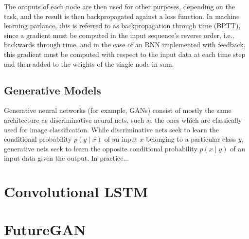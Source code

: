 \documentclass{scrartcl}
\begin{document}
The outputs of each node are then used for other purposes, depending on the
task, and the result is then backpropagated against a loss function. In machine
learning parlance, this is referred to as backpropagation through time (BPTT),
since a gradient must be computed in the input sequence's reverse order, i.e.,
backwards through time, and in the case of an RNN implemented with feedback,
this gradient must be computed with respect to the input data at each time step
and then added to the weights of the single node in sum.

\subsection{Generative Models}
\label{subsec:generative}

Generative neural networks (for example, GANs) consist of mostly the same
architecture as discriminative neural nets, such as the ones which are
classically used for image classification. While discriminative nets seek to
learn the conditional probability $p(y \mid x)$ of an input $x$ belonging to a
particular class $y$, generative nets seek to learn the opposite conditional
probability $p(x \mid y)$ of an input data given the output. In practice...

\section{Convolutional LSTM}
\label{sec:conv_lstm}

\section{FutureGAN}
\label{sec:futuregan}

\newpage
\section{}
\label{}

\newpage
\section{}
\label{}

\newpage
\section{}
\label{}

\newpage
\section{}
\label{}



\newpage

\newpage
\end{document}
